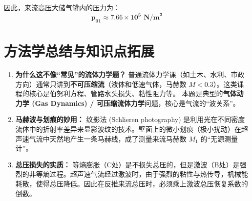 \documentclass[a4paper,11pt]{article}
\begin{document}
因此，来流高压大储气罐内的压力为：
\begin{equation*}
    \bm{p_{01} \approx 7.66 \times 10^5 \text{ N/m}^2}
\end{equation*}

\section{方法学总结与知识点拓展}

\begin{enumerate}
    \item \textbf{为什么这不像“常见”的流体力学题？}
    普通流体力学课（如土木、水利、市政方向）通常只讲到\textbf{不可压缩流}（液体和低速气体，马赫数 $M < 0.3$）。这类课程的核心是伯努利方程、管路水头损失、粘性阻力等。
    本题是典型的\textbf{气体动力学 (Gas Dynamics) / 可压缩流体力学}问题，核心是气流的“波关系”。
    
    \item \textbf{马赫波与划痕的妙用：}
    纹影法 (Schlieren photography) 是利用光在不同密度流体中的折射率差异来显影波纹的技术。壁面上的微小划痕（极小扰动）在超声速气流中天然地产生一条马赫线，成了测量来流马赫数 $M_1$ 的“无源测量计”。
    
    \item \textbf{总压损失的实质：}
    等熵膨胀（C处）是不损失总压的，但是激波（B处）是强烈的非等熵过程。超声速气流经过激波时，由于强烈的粘性与热传导，机械能耗散，使得总压降低。因此在反推来流总压时，必须乘上激波总压恢复系数的倒数。
\end{enumerate}
\end{document}
